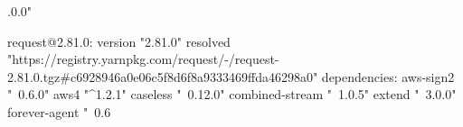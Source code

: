 .0.0"

request@2.81.0:
  version "2.81.0"
  resolved "https://registry.yarnpkg.com/request/-/request-2.81.0.tgz#c6928946a0e06c5f8d6f8a9333469ffda46298a0"
  dependencies:
    aws-sign2 "~0.6.0"
    aws4 "^1.2.1"
    caseless "~0.12.0"
    combined-stream "~1.0.5"
    extend "~3.0.0"
    forever-agent "~0.6
